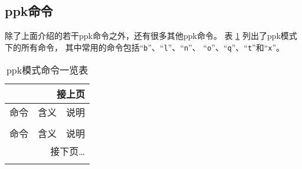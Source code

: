 \subsection{ppk命令}
除了上面介绍的若干ppk命令之外，还有很多其他ppk命令。
表 \ref{table:plotpk-commands} 列出了ppk模式下的所有命令，
其中常用的命令包括``\texttt{b}''、``\texttt{l}''、``\texttt{n}''、
``\texttt{o}''、``\texttt{q}''、``\texttt{t}''和``\texttt{x}''。

\begin{center}
\small\ttfamily
\begin{longtable}{cll}
\multicolumn{3}{r}{接上页} \\
\toprule
命令    &   含义    &   说明    \\
\midrule
\endhead
\caption{ppk模式命令一览表} \label{table:plotpk-commands}   \\
\toprule
命令    &   含义    &   说明    \\
\midrule
\endfirsthead
\bottomrule
\multicolumn{3}{r}{接下页\dots} \\
\endfoot
\bottomrule
\endlastfoot


\end{longtable}
\end{center}
